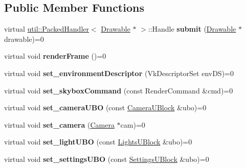 \subsection*{Public Member Functions}
\begin{DoxyCompactItemize}
\item 
\mbox{\label{classblaze_1_1Renderer_ac23c0cb1d4b874ec4e695f14e5f5ed28}} 
virtual \hyperlink{classblaze_1_1util_1_1PackedHandler}{util\+::\+Packed\+Handler}$<$ \hyperlink{classblaze_1_1Drawable}{Drawable} $\ast$ $>$\+::Handle {\bfseries submit} (\hyperlink{classblaze_1_1Drawable}{Drawable} $\ast$drawable)=0
\item 
\mbox{\label{classblaze_1_1Renderer_aa62e515e52b6443b6d44889c323f4faa}} 
virtual void {\bfseries render\+Frame} ()=0
\item 
\mbox{\label{classblaze_1_1Renderer_a03742f3dc6dddcf255619ee1e98e3ac5}} 
virtual void {\bfseries set\+\_\+environment\+Descriptor} (Vk\+Descriptor\+Set env\+DS)=0
\item 
\mbox{\label{classblaze_1_1Renderer_a72f5d088f85100cdac94005a76b36022}} 
virtual void {\bfseries set\+\_\+skybox\+Command} (const Render\+Command \&cmd)=0
\item 
\mbox{\label{classblaze_1_1Renderer_a448ca277669a14598fc092c4dd487bb6}} 
virtual void {\bfseries set\+\_\+camera\+U\+BO} (const \hyperlink{structblaze_1_1CameraUBlock}{Camera\+U\+Block} \&ubo)=0
\item 
\mbox{\label{classblaze_1_1Renderer_aedb9fa390bfb08cc1a40b1a9342b59f4}} 
virtual void {\bfseries set\+\_\+camera} (\hyperlink{classblaze_1_1Camera}{Camera} $\ast$cam)=0
\item 
\mbox{\label{classblaze_1_1Renderer_ac1083f14774761e2ae7e13e09bacb639}} 
virtual void {\bfseries set\+\_\+light\+U\+BO} (const \hyperlink{structblaze_1_1LightsUBlock}{Lights\+U\+Block} \&ubo)=0
\item 
\mbox{\label{classblaze_1_1Renderer_a639f5f579b6fbfe3adfdc066bc3f2cbc}} 
virtual void {\bfseries set\+\_\+settings\+U\+BO} (const \hyperlink{structblaze_1_1SettingsUBlock}{Settings\+U\+Block} \&ubo)=0

\end{DoxyCompactItemize}
